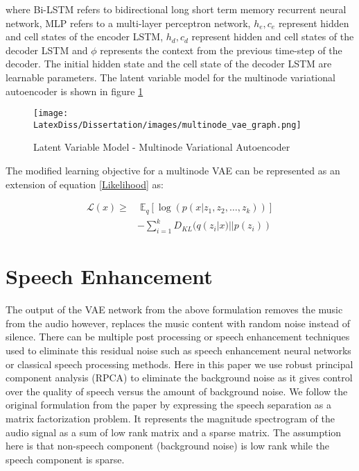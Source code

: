 where Bi-LSTM refers to bidirectional long short term memory recurrent neural network, MLP refers to a multi-layer perceptron network, $h_e, c_e$ represent hidden and cell states of the encoder LSTM, $h_d, c_d$ represent hidden and cell states of the decoder LSTM and $\phi$ represents the context from the previous time-step of the decoder. The initial hidden state and the cell state of the decoder LSTM are learnable parameters. The latent variable model for the multinode variational autoencoder is shown in figure \ref{fig:multinodevae_graph}\\

\begin{figure}[h!]
    \centering
    \texttt{[image: LatexDiss/Dissertation/images/multinode\_vae\_graph.png]}
    \caption{Latent Variable Model - Multinode Variational Autoencoder}
    \label{fig:multinodevae_graph}
\end{figure}

The modified learning objective for a multinode VAE can be represented as an extension of equation \ref{Likelihood} as:

\begin{equation}
\begin{aligned}
\mathcal{L}(x) \ge & \; \mathbb{E}_q[\log(p(x|z_1,z_2,\dots,z_k))] \\& -\sum_{i=1}^k D_{KL}(q(z_i|x) || p(z_i)) 
\end{aligned}
\end{equation}



\section{Speech Enhancement}

The output of the VAE network from the above formulation removes the music from the audio however, replaces the music content with random noise instead of silence. There can be multiple post processing or speech enhancement techniques used to eliminate this residual noise such as speech enhancement neural networks or classical speech processing methods. Here in this paper we use robust principal component analysis (RPCA) \cite{6287816} to eliminate the background noise as it gives control over the quality of speech versus the amount of background noise. We follow the original formulation from the paper by expressing the speech separation as a matrix factorization problem. It represents the magnitude spectrogram of the audio signal as a sum of low rank matrix and a sparse matrix. The assumption here is that non-speech component (background noise) is low rank while the speech component is sparse. 

